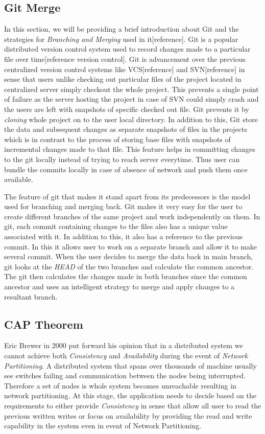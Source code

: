 \documentclass[a4paper, 11pt]{article}
\begin{document}
\subsection*{Git Merge}
In this section, we will be providing a brief introduction about Git and the strategies for \textit{Branching and Merging} used in it[reference]. Git is a popular distributed version control system used to record changes made to a particular file over time[reference version control]. Git is advancement over the previous centralized version control systems like VCS[reference] and SVN[reference] in sense that users unlike checking out particular files of the project located in centralized server simply checkout the whole project. This prevents a single point of failure as the server hosting the project in case of SVN could simply crash and the users are left with snapshots of specific checked out file. Git prevents it by \textit{cloning} whole project on to the user local directory. In addition to this, Git store the data and subsequent changes as separate snapshots of files in the projects which is in contrast to the process of storing base files with snapshots of incremental changes made to that file. This feature helps in committing changes to the git locally instead of trying to reach server everytime. Thus user can bundle the commits locally in case of absence of network and push them once available.
\par The feature of git that makes it stand apart from its predecessors is the model used for branching and merging back. Git makes it very easy for the user to create different branches of the same project and work independently on them. In git, each commit containing changes to the files also has a unique value associated with it. In addition to this, it also has a reference to the previous commit. In this it allows user to work on a separate branch and allow it to make several commit. When the user decides to merge the data back in main branch, git looks at the \textit{HEAD} of the two branches and calculate the common ancestor. The git then calculates the changes made in both branches since the common ancestor and uses an intelligent strategy to merge and apply changes to a resultant branch. 


\subsection*{CAP Theorem}
Eric Brewer in 2000 put forward his opinion that in a distributed system we cannot achieve both \textit{Consistency} and \textit{Availability} during the event of \textit{Network Partitioning}. A distributed system that spans over thousands of machine usually see switches failing and communication between the nodes being interrupted. Therefore a set of nodes is whole system becomes unreachable resulting in network partitioning. At this stage, the application needs to decide based on the requirements to either provide \textit{Consistency} in sense that allow all user to read the previous written writes or focus on availability by providing the read and write capability in the system even in event of Network Partitioning.
\end{document}
